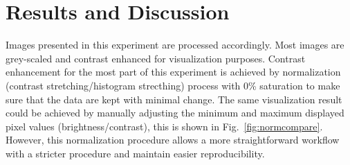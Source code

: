 
\section{Results and Discussion}

Images presented in this experiment are processed accordingly. 
Most images are grey-scaled and contrast enhanced for visualization purposes. 
Contrast enhancement for the most part of this experiment is achieved by normalization (contrast stretching/histogram strecthing) process with 0\% saturation to make sure that the data are kept with minimal change. 
The same visualization result could be achieved by manually adjusting the minimum and maximum displayed pixel values (brightness/contrast), this is shown in Fig.~\ref{fig:normcompare}. 
However, this normalization procedure allows a more straightforward workflow with a stricter procedure and maintain easier reproducibility. 

